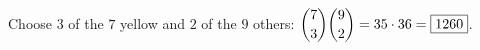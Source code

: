 Choose $3$ of the $7$ yellow and $2$ of the $9$ others: $\dbinom73\dbinom92=35\cdot36=\boxed{1260}$.
